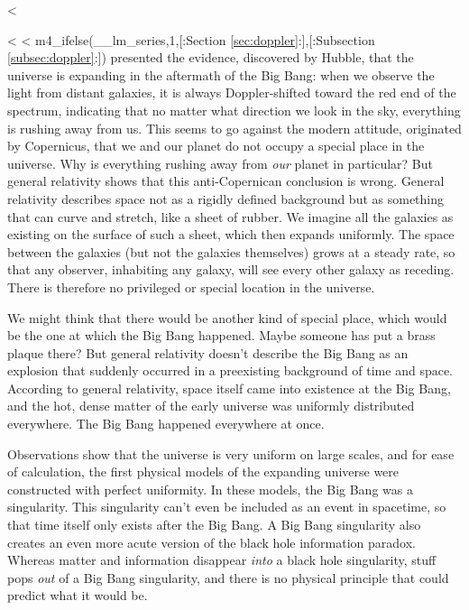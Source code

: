 <%

<%
<%
m4_ifelse(__lm_series,1,[:Section \ref{sec:doppler}:],[:Subsection \ref{subsec:doppler}:])
presented the evidence, discovered by Hubble, that the universe is expanding in the aftermath of the Big Bang:
when we observe the light from distant galaxies, it is always Doppler-shifted toward the red end of the spectrum, indicating that
no matter what direction we look in the sky, everything is rushing away from us. This seems to go against the modern attitude,
originated by Copernicus, that we and our planet do not occupy a special place in the universe. Why is everything rushing away from
\emph{our} planet in particular? But general relativity shows that this anti-Copernican conclusion is wrong. General relativity
describes space not as a rigidly defined background but as something that can curve and stretch, like a sheet of rubber.
We imagine all the galaxies as existing on the surface of such a sheet, which then expands uniformly. The space between the galaxies
(but not the galaxies themselves) grows at a steady rate, so that any observer, inhabiting any galaxy, will see every other galaxy
as receding. There is therefore no privileged or special location in the universe.

We might think that there would be another kind of special place, which would be the one at which the Big Bang happened. Maybe someone
has put a brass plaque there? But general relativity doesn't describe the Big Bang as an explosion that suddenly occurred in a
preexisting background of time and space. According to general relativity, space itself came into existence at the
Big Bang, and the hot, dense matter of the early universe was uniformly distributed everywhere. The Big Bang happened everywhere at
once.

Observations show that the universe is very uniform on large scales, and for ease of calculation, the first
physical models of the expanding universe were constructed with perfect uniformity. In these models, the Big Bang
was a singularity. This singularity can't even be included as an event in spacetime, so that time itself only exists
after the Big Bang. A Big Bang singularity also creates an even more acute version of the black hole information paradox. Whereas matter and information
disappear \emph{into} a black hole singularity, stuff pops \emph{out} of a Big Bang singularity, and there is no physical principle
that could predict what it would be.

